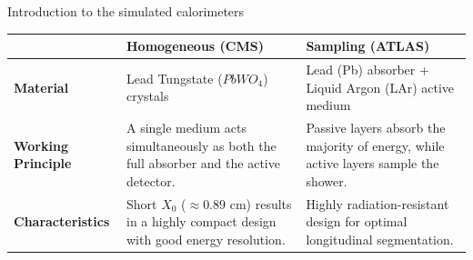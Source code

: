 \begin{frame}{Introduction to the simulated calorimeters}
    \begin{table}
        \centering
        \renewcommand{\arraystretch}{1.5} %
        \begin{tabular}{@{} p{} p{} p{} @{}}
            \toprule
            & \textbf{Homogeneous} (CMS) & \textbf{Sampling} (ATLAS) \\
            \midrule
            
            \textbf{Material} & 
            Lead Tungstate ($PbWO_4$) crystals & 
            Lead (Pb) absorber + Liquid Argon (LAr) active medium \\
            
            \textbf{Working Principle} & 
            A single medium acts simultaneously as both the full absorber and the active detector. & 
            Passive layers absorb the majority of energy, while active layers sample the shower. \\
            
            \textbf{Characteristics} & 
            Short $X_0$ ($\approx 0.89$ cm) results in a highly compact design with good energy resolution. & 
            Highly radiation-resistant design for optimal longitudinal segmentation. \\
            
            \bottomrule
        \end{tabular}
    \end{table}
\end{frame}

